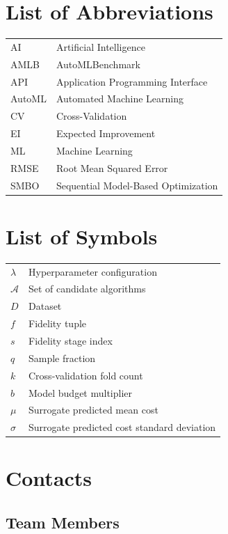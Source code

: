 \documentclass[12pt,a4paper,oneside]{report}
\begin{document}
\chapter*{List of Abbreviations}
\begin{tabular}{ll}
AI & Artificial Intelligence \\
AMLB & AutoMLBenchmark \\
API & Application Programming Interface \\
AutoML & Automated Machine Learning \\
CV & Cross-Validation \\
EI & Expected Improvement \\
ML & Machine Learning \\
RMSE & Root Mean Squared Error \\
SMBO & Sequential Model-Based Optimization \\
\end{tabular}

\clearpage
\chapter*{List of Symbols}
\begin{tabular}{ll}
$\lambda$ & Hyperparameter configuration \\
$\mathcal{A}$ & Set of candidate algorithms \\
$D$ & Dataset \\
$f$ & Fidelity tuple \\
$s$ & Fidelity stage index \\
$q$ & Sample fraction \\
$k$ & Cross-validation fold count \\
$b$ & Model budget multiplier \\
$\mu$ & Surrogate predicted mean cost \\
$\sigma$ & Surrogate predicted cost standard deviation \\
\end{tabular}

\clearpage
\chapter*{Contacts}

\section*{Team Members}
\end{document}
